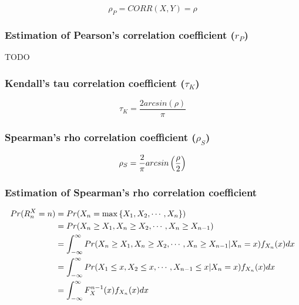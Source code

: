 \[
    \rho_P
    = CORR(X,Y)
    = \rho
\]

\subsubsection{Estimation of Pearson’s correlation coefficient ($r_P$) \cite{ism-1}} \label{Normal distribution: Bivariate/ Multivariate: Estimation of Pearson’s correlation coefficient}

TODO

\subsubsection{Kendall’s tau correlation coefficient ($\tau_K$) \cite{ism-1}} \label{Normal distribution: Bivariate/ Multivariate: Kendall’s tau correlation coefficient}

\[
    \tau_K = \dfrac{2 arcsin(\rho)}{\pi}
\]

\subsubsection{Spearman’s rho correlation coefficient ($\rho_S$) \cite{ism-1}} \label{Normal distribution: Bivariate/ Multivariate: Spearman’s rho correlation coefficient}

\[
    \rho_S = \dfrac{2}{\pi} arcsin\left(\dfrac{\rho}{2}\right)
\]

\subsubsection{Estimation of Spearman’s rho correlation coefficient \cite{ism-1}} \label{Normal distribution: Bivariate/ Multivariate: Estimation of Spearman’s rho correlation coefficient}

\[
\begin{aligned}
    Pr(R^X_n = n) 
    &= Pr(X_n = \max\left\{X_1, X_2,\cdots , X_n\right\}) \\
    &= Pr(X_n \geq X_1, X_n \geq X_2,\cdots , X_n \geq X_{n-1}) \\
    &= \displaystyle\int_{-\infty}^{\infty}
        Pr(X_n \geq X_1, X_n \geq X_2,\cdots, X_n \geq X_{n-1}|X_n = x) f_{X_n}(x)dx \\
    &= \displaystyle\int_{-\infty}^{\infty}
        Pr(X_1 \leq x, X_2 \leq x,\cdots, X_{n-1} \leq x|X_n = x) f_{X_n}(x)dx \\
    &= \displaystyle\int_{-\infty}^{\infty} F^{n-1}_X (x) f_{X_n}(x)dx
\end{aligned}
\]

